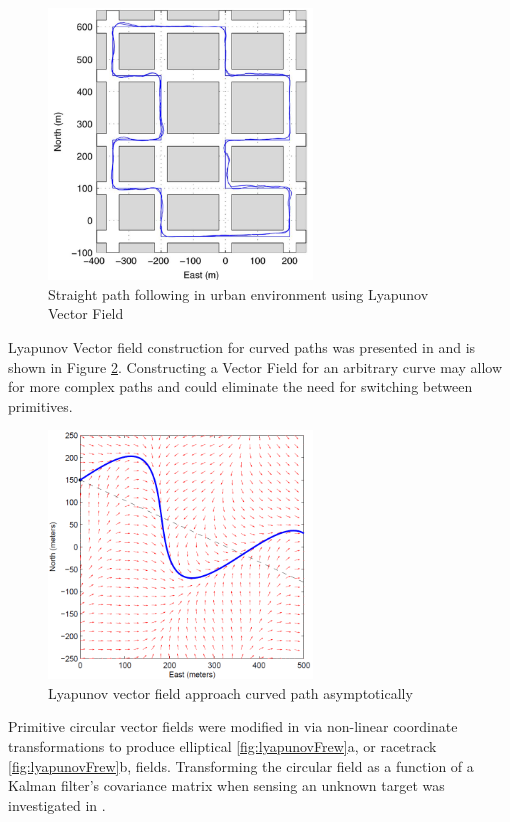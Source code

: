 \documentclass[numbered,pdftex]{ohio-etd}
\begin{document}
\begin{figure}[H]
	\centering
	\includegraphics[width=7cm]{PaperFigures/urbanFollowingNelson}
	\caption{Straight path following in urban environment \cite{nelson_cooperative_2005} using Lyapunov Vector Field}
	\label{fig:urbanfollowingnelson}
\end{figure}

Lyapunov Vector field construction for curved paths was presented in \cite{griffiths_vector_2006} and is shown in Figure \ref{fig:griffiths}. Constructing a Vector Field for an arbitrary curve may allow for more complex paths and could eliminate the need for switching between primitives. 

\begin{figure}[H]
	\centering
	\includegraphics[width=7cm]{PaperFigures/griffiths}
	\caption{Lyapunov vector field approach curved path asymptotically \cite{griffiths_vector_2006}}
	\label{fig:griffiths}
\end{figure}


Primitive circular vector fields were modified in \cite{frew_lyapunov_nodate,frew_cooperative_2007} via non-linear coordinate transformations to produce elliptical \ref{fig:lyapunovFrew}a, or racetrack \ref{fig:lyapunovFrew}b, fields. Transforming the circular field as a function of a Kalman filter's covariance matrix when sensing an unknown target was investigated in \cite{frew_cooperative_2007}. 
\end{document}
